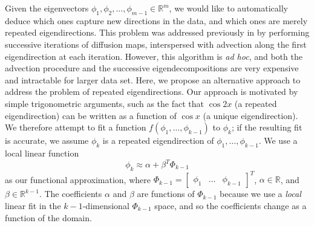 \documentclass[3p]{elsarticle}
\begin{document}
Given the eigenvectors $\phi_1, \phi_2, \dots, \phi_{m-1} \in \mathbb{R}^m$, we would like to automatically deduce which ones capture new directions in the data, and which ones are merely repeated eigendirections. 
%
This problem was addressed previously in \cite{gerber2007robust} by performing successive iterations of diffusion maps, interspersed with advection along the first eigendirection at each iteration. 
%
However, this algorithm is {\em ad hoc}, and both the advection procedure and the successive eigendecompositions are very expensive and intractable for larger data set. 
%
Here, we propose an alternative approach to address the problem of repeated eigendirections. 
%
Our approach is motivated by simple trigonometric arguments, such as the fact that $\cos2x$ (a repeated eigendirection) can be written as a function of $\cos x$ (a unique eigendirection). 
%
We therefore attempt to fit a function $f(\phi_1, \dots, \phi_{k-1})$ to $\phi_{k}$; if the resulting fit is accurate, we assume $\phi_{k}$ is a repeated eigendirection of $\phi_1, \dots, \phi_{k-1}$. 
%
We use a local linear function 
\begin{equation}
\phi_k \approx \alpha + \beta^T \Phi_{k-1}
\end{equation}
%
as our functional approximation, where 
%
$\Phi_{k-1} = \begin{bmatrix} \phi_1 & \dots & \phi_{k-1} \end{bmatrix}^T$,
$\alpha \in \mathbb{R}$, and $\beta \in \mathbb{R}^{k-1}$. 
%
The coefficients $\alpha$ and $\beta$ are functions of $\Phi_{k-1}$ because we use a {\em local} linear fit in the $k-1$-dimensional $\Phi_{k-1}$ space, and so the coefficients change as a function of the domain. 
\end{document}
